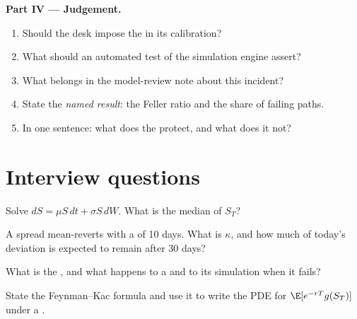 \begin{problem}
\medskip\noindent\textbf{Part IV --- Judgement.}
\begin{enumerate}[resume]
\item Should the desk impose the  in its calibration?
\item What should an automated test of the simulation engine assert?
\item What belongs in the model-review note about this incident?
\item State the \emph{named result}: the Feller ratio and the share of failing paths.
\item In one sentence: what does the  protect, and what does it not?
\end{enumerate}
\end{problem}

\section{Interview questions}

\begin{interviewq}\label{iq:qm:stochastic-differential-equations:1}
Solve $dS = \mu S\,dt + \sigma S\,dW$. What is the median of $S_T$?
\end{interviewq}

\begin{interviewq}\label{iq:qm:stochastic-differential-equations:2}
A spread mean-reverts with a  of 10 days. What is $\kappa$, and how much of today's
deviation is expected to remain after 30 days?
\end{interviewq}

\begin{interviewq}\label{iq:qm:stochastic-differential-equations:3}
What is the , and what happens to a  and to its simulation
when it fails?
\end{interviewq}

\begin{interviewq}\label{iq:qm:stochastic-differential-equations:4}
State the Feynman--Kac formula and use it to write the PDE for $\E[e^{-rT}g(S_T)]$ under a
.
\end{interviewq}

